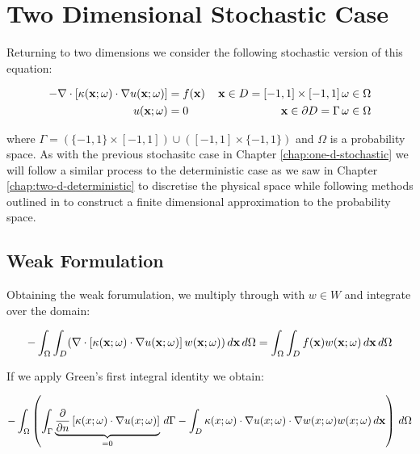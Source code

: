 \chapter{Two Dimensional Stochastic Case}

Returning to two dimensions we consider the following stochastic version of
this equation:

\begin{equation}\label{eq:twod-stochastic}
  \begin{aligned}
      -\nabla\cdot\left[\kappa(\mathbf{x};\omega)\cdot\nabla u(\mathbf{x};\omega) \right]
      &= f(\mathbf{x})\, &\mathbf{x} \in D = [-1,1] \times [-1,1]\, \omega \in \Omega \\
      u(\mathbf{x};\omega) &= 0\, &\mathbf{x} \in \partial D = \Gamma\, \omega \in \Omega
  \end{aligned}
\end{equation}

where $\Gamma = (\{-1,1\} \times [-1,1]) \cup ([-1,1] \times \{-1, 1\})$ and
$\Omega$ is a probability space. As with the previous stochasitc case in
Chapter \ref{chap:one-d-stochastic} we will follow a similar process to the
deterministic case as we saw in Chapter \ref{chap:two-d-deterministic} to
discretise the physical space while following methods outlined in
\cite{general-poly-chaos} to construct a finite dimensional approximation to
the probability space.

\section{Weak Formulation}


Obtaining the weak forumulation, we multiply through with $w \in W$ and
integrate over the domain:

\begin{equation}
    -\int_{\Omega}\int_D(\nabla\cdot\left[
        \kappa(\mathbf{x};\omega)\cdot\nabla u(\mathbf{x};\omega)\right]
    w(\mathbf{x};\omega))\, d\mathbf{x}\, d\Omega =
        \int_{\Omega}\int_Df(\mathbf{x})w(\mathbf{x};\omega)\, d\mathbf{x}\, d\Omega
\end{equation}

If we apply Green's first integral identity we obtain:

\begin{equation}
    -\int_{\Omega}\left(\int_{\Gamma}\underbrace{\frac{\partial}{\partial n}
        \left[\kappa(x;\omega)\cdot\nabla u(x;\omega)\right]}_{=0}\, d\Gamma
      -\int_D \kappa(x;\omega)\cdot\nabla u(x;\omega)\cdot\nabla w(x;\omega)
      w(x;\omega)\, d\mathbf{x}
  \right)\, d\Omega
\end{equation}

